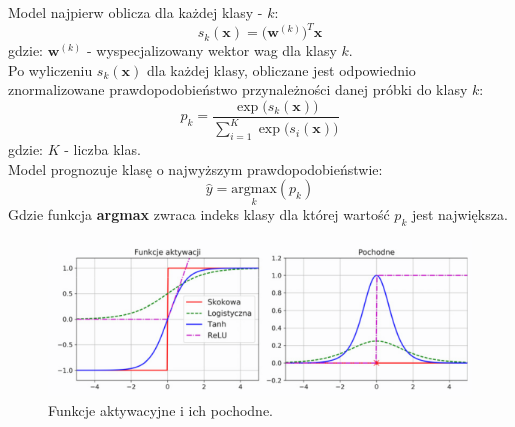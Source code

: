 \documentclass{article}
\renewcommand{\vec}[1]{\mathbf{#1}}
\begin{document}
\begin{itemize}
Model najpierw oblicza dla każdej klasy - $k$:
\begin{equation}
	s_k(\vec{x}) = \big(\vec{w}^{(k)}\big)^T\vec{x}
\end{equation}
gdzie: $\vec{w}^{(k)}$ - wyspecjalizowany wektor wag dla klasy $k$.\\
Po wyliczeniu $s_k(\vec{x})$ dla każdej klasy, obliczane jest odpowiednio znormalizowane 
prawdopodobieństwo przynależności danej próbki do klasy $k$:
\begin{equation}
	p_k = \frac{\exp\big(s_k(\vec{x})\big)}{\sum_{i=1}^{K} \exp\big(s_i(\vec{x})\big)}
\end{equation}
gdzie: $K$ - liczba klas.\\ 
Model prognozuje klasę o najwyższym prawdopodobieństwie:
\begin{equation}
	\hat{y} = \underset{k}{\text{argmax}}(p_k)
\end{equation}
Gdzie funkcja \textbf{argmax} zwraca indeks klasy dla której wartość $p_k$ jest największa.\\
\end{itemize}

\begin{figure}[H]
\centering
\includegraphics[scale=0.6]{f_a.png}
\caption{Funkcje aktywacyjne i ich pochodne. \cite{um}}
\end{figure}
\end{document}

